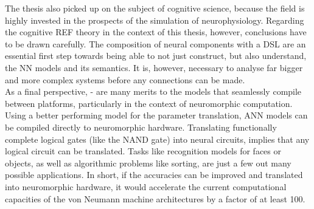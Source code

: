 \documentclass[report.tex]{subfiles}
\begin{document}
The thesis also picked up on the subject of cognitive science, because the field
is highly invested in the prospects of the simulation of neurophysiology.
Regarding the cognitive REF theory in the context of this thesis, however,
conclusions have to be drawn carefully.
The composition of neural components with a \gls{DSL} are an essential first
step towards being able to not just construct, but also understand, the 
\gls{NN} models and its semantics.
It is, however, necessary to analyse far bigger and more complex systems before
any connections can be made.
\\[0.1cm]

As a final perspective, - are many merits to the models that seamlessly
compile between platforms, particularly in the context of neuromorphic
computation.
Using a better performing model for the parameter translation, \gls{ANN} models can
be compiled directly to neuromorphic hardware.
Translating functionally complete logical gates (like the NAND gate) into neural
circuits, implies that any logical circuit can be translated.
Tasks like recognition models for faces or objects, as well as algorithmic
problems like sorting, are just a few out many possible applications.
In short, if the accuracies can be improved and translated into neuromorphic hardware, it
would accelerate the current computational capacities of the von Neumann machine
architectures by a factor of at least 100.
\\[0.1cm]

\FloatBarrier
\end{document}
